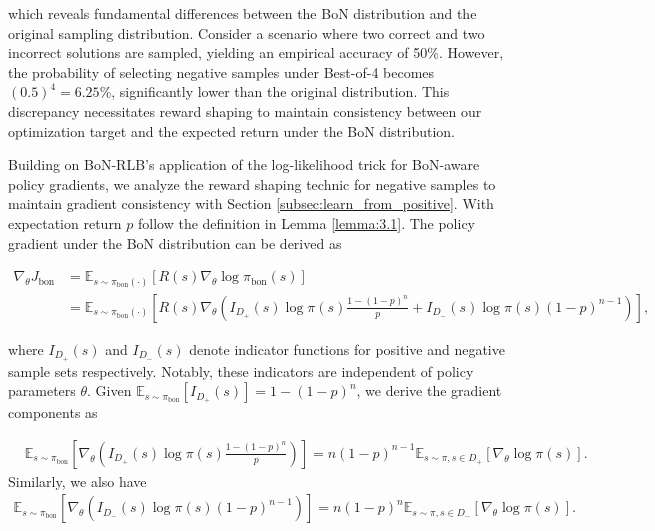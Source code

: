 which reveals fundamental differences between the BoN distribution and the original sampling distribution. Consider a scenario where two correct and two incorrect solutions are sampled, yielding an empirical accuracy of 50\%. However, the probability of selecting negative samples under Best-of-4 becomes $(0.5)^4 = 6.25\%$, significantly lower than the original distribution. This discrepancy necessitates reward shaping to maintain consistency between our optimization target and the expected return under the BoN distribution.

Building on BoN-RLB's \cite{chow2024inference} application of the log-likelihood trick for BoN-aware policy gradients, we analyze the reward shaping technic for negative samples to maintain gradient consistency with Section \ref{subsec:learn_from_positive}. With expectation return $p$ follow the definition in Lemma \ref{lemma:3.1}. The policy gradient under the BoN distribution can be derived as

\begin{equation}
\begin{aligned}
\nabla_\theta J_{\text{bon}} &= \mathbb{E}_{s \sim \pi_{\text{bon}}(\cdot)}\left[R(s) \nabla_\theta \log \pi_{\text{bon}}(s)\right] \\
&= \mathbb{E}_{s \sim \pi_{\text{bon}}(\cdot)}\left[R(s) \nabla_\theta\left( I_{D_+}(s)\log \pi(s)\frac{1 - (1-p)^n}{p} + I_{D_-}(s)\log \pi(s)(1-p)^{n-1} \right)\right],
\end{aligned}
\end{equation}

where $I_{D_+}(s)$ and $I_{D_-}(s)$ denote indicator functions for positive and negative sample sets respectively. Notably, these indicators are independent of policy parameters $\theta$. Given $\mathbb{E}_{s \sim \pi_{\text{bon}}}[I_{D_+}(s)] = 1-(1-p)^n$, we derive the gradient components as

\begin{align*}
    &\mathbb{E}_{s \sim \pi_{\text{bon}}}\left[\nabla_\theta \left( I_{D_+}(s) \log \pi(s)\frac{1 - (1-p)^n}{p}\right)\right] = n(1-p)^{n-1} \mathbb{E}_{s \sim \pi, s\in D_+}\left[\nabla_\theta \log \pi(s)\right].
\end{align*}
Similarly, we also have
\begin{align*}
\mathbb{E}_{s \sim \pi_{\text{bon}}}\left[\nabla_\theta \left( I_{D_-}(s) \log \pi(s)(1-p)^{n-1}\right)\right] = n(1-p)^n \mathbb{E}_{s \sim \pi, s\in D_-}\left[\nabla_\theta \log \pi(s)\right].
\end{align*}

